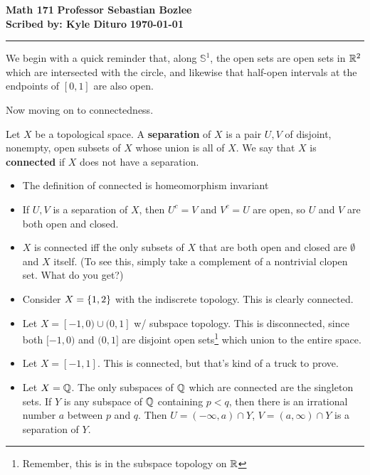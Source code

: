 \documentclass[12pt, twosided]{article}
\begin{document}
\noindent \textbf{Math 171} \hfill \textbf{Professor Sebastian Bozlee} \\
\textbf{Scribed by: Kyle Dituro} \hfill \textbf{\today}\hrule
\vspace{.2in}

We begin with a quick reminder that, along \(\mathbb{S}^1\), the open sets are open sets in \(\mathbb{R}^2\) which are intersected with the circle, and likewise that half-open intervals at the endpoints of \([0, 1]\) are also open.

Now moving on to connectedness.


\begin{df}
  Let \(X\) be a topological space. A \textbf{separation} of \(X\) is a pair \(U, V\) of disjoint, nonempty, open subsets of \(X\) whose union is all of \(X\). We say that \(X\) is \textbf{connected} if \(X\) does not have a separation.
\end{df}


\begin{rmk}
  \begin{itemize}
  \item The definition of connected is homeomorphism invariant
  \item If \(U, V\) is a separation of \(X\), then \(U^c = V\) and \(V^c = U\) are open, so \(U\) and \(V\) are both open and closed.
  \item \(X\) is connected iff the only subsets of \(X\) that are both open and closed are \(\emptyset\) and \(X\) itself. (To see this, simply take a complement of a nontrivial clopen set. What do you get?)
  \end{itemize}
\end{rmk}

\begin{exa}
  \begin{itemize}
  \item Consider \(X = \left\{ 1, 2 \right\}\) with the indiscrete topology. This is clearly connected.
  \item Let \(X = [-1, 0) \cup (0, 1]\) w/ subspace topology. This is disconnected, since both \([-1, 0)\) and \((0,1]\) are disjoint open sets\footnote{Remember, this is in the subspace topology on \(\mathbb{R}\)} which union to the entire space.
  \item Let \(X = [-1, 1]\). This is connected, but that's kind of a truck to prove.
  \item Let \(X = \mathbb{Q}\). The only subspaces of \(\mathbb{Q}\) which are connected are the singleton sets. If \(Y\) is any subspace of \(\mathbb{Q}\) containing \(p < q\), then there is an irrational number \(a\) between \(p\) and \(q\). Then \(U = (-\infty, a) \cap Y\), \(V = (a, \infty) \cap Y\) is a separation of \(Y\).
  \end{itemize}
\end{exa}
\end{document}
